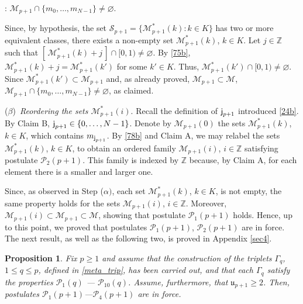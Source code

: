 \documentclass[reqno]{amsart}
\theoremstyle{plain}
\newtheorem{proposition}[theorem]{Proposition}
\theoremstyle{definition}
\newcommand{\mc}[1]{{\mathcal #1}}
\newcommand{\mf}[1]{{\mathfrak #1}}
\newcommand{\bb}[1]{{\mathbb #1}}
\newcommand{\ms}[1]{{\mathscr #1}}
\newcommand{\mss}[1]{{\textsf #1}}
\newcounter{as}[section]
\newcommand{\<}{\langle}
\renewcommand{\>}{\rangle}
\begin{document}
\smallskip{}: $\ms M_{p+1} \cap \{m_0,
\dots, m_{N-1}\} \not = \varnothing$. 
\smallskip

Since, by hypothesis, the set
$\ms S_{p+1} = \{ \ms M^*_{p+1}(k) : k\in K\}$ has two or more
equivalent classes, there exists a non-empty set $\ms M^*_{p+1}(k)$,
$k\in K$. Let $j\in \bb Z$ such that
$[\,\ms M^*_{p+1}(k) + j\,] \cap [0,1) \neq \varnothing$.  By
\eqref{75b}, $\ms M^*_{p+1}(k) +j = \ms M^*_{p+1}(k')$ for some
$k'\in K$. Thus, $\ms M^*_{p+1}(k') \cap [0,1) \neq
\varnothing$. Since $\ms M^*_{p+1}(k') \subset \ms M_{p+1}$ and, as
already proved, $\ms M_{p+1} \subset \mc M$,
$\ms M_{p+1} \cap \{m_0, \dots, m_{N-1}\} \not = \varnothing$, as
claimed.

\medskip\noindent ($\beta$){\it \ Reordering the sets
$\ms M^*_{p+1}(i)$}.  Recall the definition of $\mss j_{p+1}$
introduced \eqref{24b}.  By Claim B,
$\mss j_{p+1} \in \{0, \dots, N-1\}$.  Denote by $\ms M_{p+1}(0)$ the
sets $\ms M^*_{p+1}(k)$, $k\in K$, which contains $m_{\mss
j_{p+1}}$. By \eqref{78b} and Claim A, we may relabel the
sets $\ms M^*_{p+1}(k)$, $k\in K$, to obtain an ordered family
$\ms M_{p+1}(i)$, $i\in \bb Z$ satisfying postulate $\mc
P_2(p+1)$. This family is indexed by $\bb Z$ because, by Claim
A, for each element there is a smaller and larger one. 

Since, as observed in Step ($\alpha)$, each set $\ms M^*_{p+1}(k)$,
$k\in K$, is not empty, the same property holds for the sets
$\ms M_{p+1}(i)$, $i\in \bb Z$. Moreover,
$\ms M_{p+1}(i) \subset \ms M_{p+1} \subset \mc M$, showing that
postulate $\mc P_1(p+1)$ holds.  Hence, up to this point, we proved
that postulates $\mc P_1(p+1)$, $\mc P_2(p+1)$ are in force.  The next
result, as well as the following two, is proved in Appendix
\ref{sec4}.

\begin{proposition}
\label{l12b}
Fix $p\geq 1$ and assume that the construction of the triplets
$\Gamma_{q}$, $1\le q\le p$, defined in \eqref{meta_trip}, has been
carried out, and that each $\Gamma_q$ satisfy the properties
$\mc P_1 (q)$ --- $\mc P_{10}(q)$. Assume, furthermore, that
$\mf u_{p+1}\ge 2$. Then, postulates $\mc P_1(p+1)$---$\mc P_4(p+1)$
are in force. 
\end{proposition}
\end{document}
